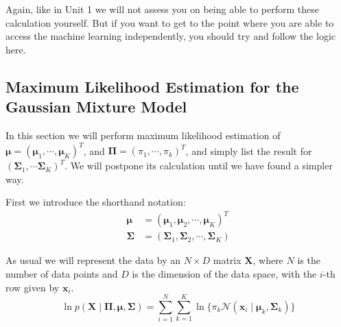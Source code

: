 Again, like in Unit 1 we will not assess you on being able to perform these calculation yourself. But if you want to get to the point where you are able to access
the machine learning independently, you should try and follow the logic here.



\subsection{Maximum Likelihood Estimation for the Gaussian Mixture Model}
In this section we will perform maximum likelihood estimation of $\boldsymbol{\mu} = (\boldsymbol{\mu}_1, \cdots, \boldsymbol{\mu}_K)^T$,
and $\boldsymbol{\Pi} = (\pi_1, \cdots, \pi_k)^T$, and simply list the result for $(\boldsymbol{\Sigma}_1, \cdots \boldsymbol{\Sigma}_K)^T$.  We will postpone
its calculation until we have found a simpler way.


First we introduce the shorthand notation:
\begin{align}
  \boldsymbol{\mu} &  = (\boldsymbol{\mu}_1, \boldsymbol{\mu}_2, \cdots, \boldsymbol{\mu}_K)^T \nonumber \\
  \boldsymbol{\Sigma} & = (\boldsymbol{\Sigma}_1, \boldsymbol{\Sigma}_2, \cdots, \boldsymbol{\Sigma}_K)
\end{align}

As usual we will represent the data by an $N \times D$ matrix $\boldsymbol{X}$, where $N$ is the number of data points and $D$ is the dimension of the data space, with the
$i$-th row given by $\boldsymbol{x}_i$.
\begin{equation}
\ln p(\boldsymbol{X} \mid \boldsymbol{\Pi}, \boldsymbol{\mu}, \boldsymbol{\Sigma})  = \sum^N_{i=1} \sum^K_{k=1} \ln \{ \pi_k  \mathcal{N}(\boldsymbol{x}_i \mid \boldsymbol{\mu}_k, \boldsymbol{\Sigma}_k) \}
\label{eq-margllh}
\end{equation}


